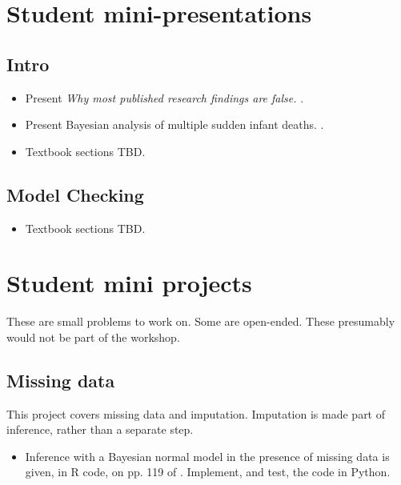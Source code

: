 \documentclass{article} %
\begin{document}
{}



\appendix

\section{Student mini-presentations}

\subsection{Intro} 
\begin{itemize}
\item Present \textit{Why most published research findings are false. } \cite{ioannidis2005most}.
\item Present Bayesian analysis of multiple sudden infant deaths.  \cite{hill2004multiple}.
\item Textbook sections TBD. 
\end{itemize}

\subsection{Model Checking} 
\begin{itemize}
\item Textbook sections TBD. 
\end{itemize}

\section{Student mini projects}

These are small problems to work on.  Some are open-ended.  These presumably would not be part of the workshop.

\subsection{Missing data}

This project covers missing data and imputation.  Imputation is made part of inference,  rather than a separate step. 

\begin{itemize}
\item  Inference with a Bayesian normal model in the presence of missing data is given,  in R code,  on pp. 119 of \cite{hoff2009first}.    Implement,  and test,  the code in Python.
\end{itemize}
\end{document}
